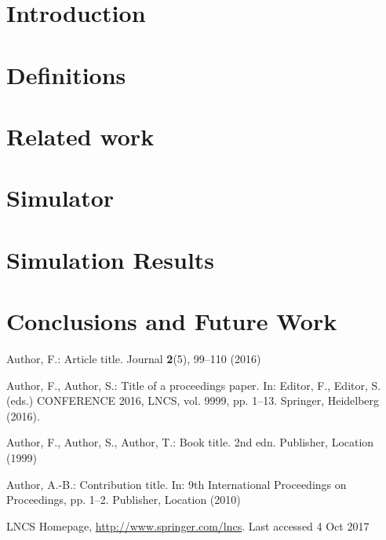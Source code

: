 \documentclass[runningheads]{llncs}
\begin{document}
\section{Introduction}
\label{sec:intro}


\section{Definitions}
\label{sec:defs}


\section{Related work}
\label{sec:related}


\section{Simulator}
\label{sec:simulator}


\section{Simulation Results}
\label{sec:results}


\section{Conclusions and Future Work}
\label{sec:conc}



%
%
%
% 
% 
%
\begin{thebibliography}{8}
Author, F.: Article title. Journal \textbf{2}(5), 99--110 (2016)

Author, F., Author, S.: Title of a proceedings paper. In: Editor,
F., Editor, S. (eds.) CONFERENCE 2016, LNCS, vol. 9999, pp. 1--13.
Springer, Heidelberg (2016). 

Author, F., Author, S., Author, T.: Book title. 2nd edn. Publisher,
Location (1999)

Author, A.-B.: Contribution title. In: 9th International Proceedings
on Proceedings, pp. 1--2. Publisher, Location (2010)

LNCS Homepage, \url{http://www.springer.com/lncs}. Last accessed 4
Oct 2017
\end{thebibliography}
\end{document}
